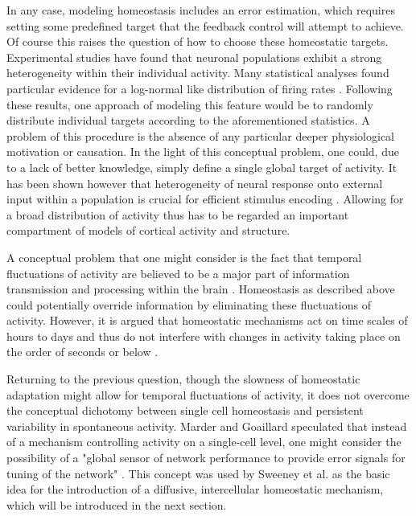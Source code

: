 \documentclass[10pt,a4paper]{article}
\begin{document}
In any case, modeling homeostasis includes an error estimation, which requires setting some predefined target that the feedback control will attempt to achieve. Of course this raises the question of how to choose these homeostatic targets. Experimental studies have found that neuronal populations exhibit a strong heterogeneity within their individual activity. Many statistical analyses found particular evidence for a log-normal like distribution of firing rates \cite{Buzsaki_Fir_Rates_2014,Wohrer_Fir_Rates_2012}. Following these results, one approach of modeling this feature would be to randomly distribute individual targets according to the aforementioned statistics. A problem of this procedure is the absence of any particular deeper physiological motivation or causation. In the light of this conceptual problem, one could, due to a lack of better knowledge, simply define a single global target of activity. It has been shown however that heterogeneity of neural response onto external input within a population is crucial for efficient stimulus encoding \cite{Marsat_2010}. Allowing for a broad distribution of activity thus has to be regarded an important compartment of models of cortical activity and structure.

A conceptual problem that one might consider is the fact that temporal fluctuations of activity are believed to be a major part of information transmission and processing within the brain \cite[p. 123-150]{Theor_Neur_Dayan}. Homeostasis as described above could potentially override information by eliminating these fluctuations of activity. However, it is argued that homeostatic mechanisms act on time scales of hours to days and thus do not interfere with changes in activity taking place on the order of seconds or below \cite{Turrigiano_2011}.

Returning to the previous question, though the slowness of homeostatic adaptation might allow for temporal fluctuations of activity, it does not overcome the conceptual dichotomy between single cell homeostasis and persistent variability in spontaneous activity. Marder and Goaillard speculated that instead of a mechanism controlling activity on a single-cell level, one might consider the possibility of a "global sensor of network performance to provide error signals for tuning of the network" \cite{Marder_2006}. This concept was used by Sweeney et al. as the basic idea for the introduction of a diffusive, intercellular homeostatic mechanism, which will be introduced in the next section.
\end{document}
